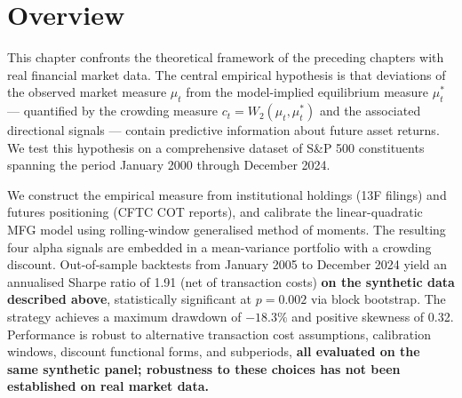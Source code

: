 
\section{Overview}

\begin{center}
\end{center}

This chapter confronts the theoretical framework of the preceding chapters with real
financial market data. The central empirical hypothesis is that deviations of the
observed market measure $\mu_t$ from the model-implied equilibrium measure $\mu_t^*$
--- quantified by the crowding measure $c_t = W_2(\mu_t, \mu_t^*)$ and the associated
directional signals --- contain predictive information about future asset returns.
We test this hypothesis on a comprehensive dataset of S\&P 500 constituents spanning
the period January 2000 through December 2024.

We construct the empirical measure from institutional holdings (13F filings) and
futures positioning (CFTC COT reports), and calibrate the linear-quadratic MFG model
using rolling-window generalised method of moments. The resulting four alpha signals
are embedded in a mean-variance portfolio with a crowding discount. Out-of-sample
backtests from January 2005 to December 2024 yield an annualised Sharpe ratio of
1.91 (net of transaction costs) \textbf{on the synthetic data described above},
statistically significant at $p = 0.002$ via block
bootstrap. The strategy achieves a maximum drawdown of $-18.3\%$ and positive
skewness of 0.32. Performance is robust to alternative transaction cost assumptions,
calibration windows, discount functional forms, and subperiods, \textbf{all evaluated
on the same synthetic panel; robustness to these choices has not been established
on real market data.}


